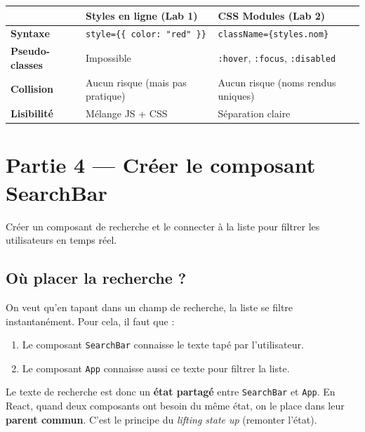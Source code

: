 \documentclass[11pt,a4paper]{article}
\begin{document}
\begin{retenirbox}
\begin{center}
\begin{tabular}{lp{5cm}p{5cm}}
\toprule
& \textbf{Styles en ligne} (Lab 1) & \textbf{CSS Modules} (Lab 2) \\
\midrule
\textbf{Syntaxe} & \texttt{style=\{\{ color: "red" \}\}} & \texttt{className=\{styles.nom\}} \\
\textbf{Pseudo-classes} & Impossible & \texttt{:hover}, \texttt{:focus}, \texttt{:disabled} \\
\textbf{Collision} & Aucun risque (mais pas pratique) & Aucun risque (noms rendus uniques) \\
\textbf{Lisibilité} & Mélange JS + CSS & Séparation claire \\
\bottomrule
\end{tabular}
\end{center}
\end{retenirbox}

\section{Partie 4 --- Créer le composant SearchBar}
\label{sec:searchbar}

\begin{objectifbox}
Créer un composant de recherche et le connecter à la liste pour filtrer les utilisateurs en temps réel.
\end{objectifbox}

\subsection{Où placer la recherche ?}

On veut qu'en tapant dans un champ de recherche, la liste se filtre instantanément. Pour cela, il faut que :

\begin{enumerate}[nosep]
    \item Le composant \texttt{SearchBar} connaisse le texte tapé par l'utilisateur.
    \item Le composant \texttt{App} connaisse aussi ce texte pour filtrer la liste.
\end{enumerate}

Le texte de recherche est donc un \textbf{état partagé} entre \texttt{SearchBar} et \texttt{App}. En React, quand deux composants ont besoin du même état, on le place dans leur \textbf{parent commun}. C'est le principe du \emph{lifting state up} (remonter l'état).
\end{document}
